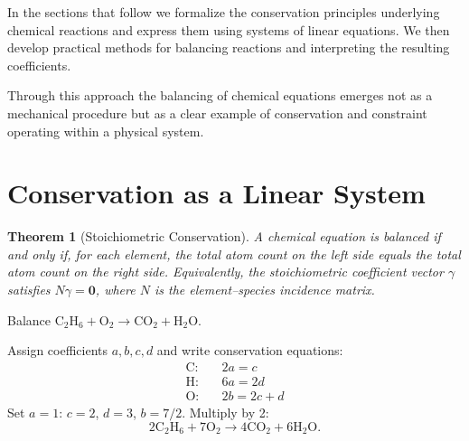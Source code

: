 \documentclass[11pt, openany]{book}
\theoremstyle{plain}
\newtheorem{theorem}{Theorem}[chapter]
\theoremstyle{definition}
\theoremstyle{remark}
\begin{document}
\medskip

In the sections that follow we formalize the conservation principles
underlying chemical reactions and express them using systems of linear
equations. We then develop practical methods for balancing reactions and
interpreting the resulting coefficients.

Through this approach the balancing of chemical equations emerges not as
a mechanical procedure but as a clear example of conservation and
constraint operating within a physical system.

\section{Conservation as a Linear System}

\begin{theorem}[Stoichiometric Conservation]
A chemical equation is balanced if and only if, for each element, the total
atom count on the left side equals the total atom count on the right side.
Equivalently, the stoichiometric coefficient vector $\gamma$ satisfies
$N\gamma=\mathbf{0}$, where $N$ is the element--species incidence matrix.
\end{theorem}

\begin{myexample}
Balance $\mathrm{C_2H_6+O_2\to CO_2+H_2O}$.

Assign coefficients $a,b,c,d$ and write conservation equations:
\begin{align*}
  \text{C}: & \quad 2a=c \\
  \text{H}: & \quad 6a=2d \\
  \text{O}: & \quad 2b=2c+d
\end{align*}
Set $a=1$: $c=2$, $d=3$, $b=7/2$. Multiply by 2:
\[
  2\mathrm{C_2H_6}+7\mathrm{O_2}\to4\mathrm{CO_2}+6\mathrm{H_2O}.
\]
\end{myexample}

\begin{center}
\end{center}
\end{document}
